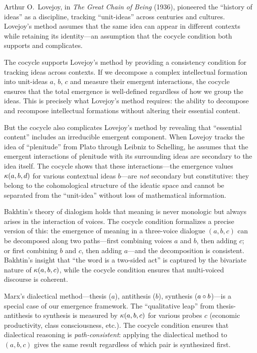 \begin{interpretation}\label{interp:ch2:cocycle_history_ideas}
Arthur O.~Lovejoy, in \emph{The Great Chain of Being} (1936), pioneered
the ``history of ideas'' as a discipline, tracking ``unit-ideas'' across
centuries and cultures. Lovejoy's method assumes that the same idea can
appear in different contexts while retaining its identity---an assumption
that the cocycle condition both supports and complicates.

The cocycle supports Lovejoy's method by providing a consistency condition
for tracking ideas across contexts. If we decompose a complex intellectual
formation into unit-ideas $a$, $b$, $c$ and measure their emergent
interactions, the cocycle ensures that the total emergence is
well-defined regardless of how we group the ideas. This is precisely
what Lovejoy's method requires: the ability to decompose and recompose
intellectual formations without altering their essential content.

But the cocycle also complicates Lovejoy's method by revealing that
``essential content'' includes an irreducible emergent component. When
Lovejoy tracks the idea of ``plenitude'' from Plato through Leibniz to
Schelling, he assumes that the emergent interactions of plenitude with
its surrounding ideas are secondary to the idea itself. The cocycle
shows that these interactions---the emergence values $\kappa(a, b, d)$
for various contextual ideas $b$---are \emph{not} secondary but
constitutive: they belong to the cohomological structure of the ideatic
space and cannot be separated from the ``unit-idea'' without loss of
mathematical information.
\end{interpretation}

\begin{example}
Bakhtin's theory of dialogism holds that meaning is never monologic but
always arises in the interaction of voices. The cocycle condition formalizes
a precise version of this: the emergence of meaning in a three-voice
dialogue $(a, b, c)$ can be decomposed along two paths---first combining
voices $a$ and $b$, then adding $c$; or first combining $b$ and $c$, then
adding $a$---and the decomposition is consistent. Bakhtin's insight that
``the word is a two-sided act'' is captured by the bivariate nature of
$\kappa(a,b,c)$, while the cocycle condition ensures that multi-voiced
discourse is coherent.
\end{example}

\begin{example}
Marx's dialectical method---thesis ($a$), antithesis ($b$), synthesis
($a \circ b$)---is a special case of our emergence framework. The
``qualitative leap'' from thesis-antithesis to synthesis is measured by
$\kappa(a, b, c)$ for various probes $c$ (economic productivity,
class consciousness, etc.). The cocycle condition ensures that
dialectical reasoning is \emph{path-consistent}: applying the dialectical
method to $(a, b, c)$ gives the same result regardless of which pair
is synthesized first.
\end{example}

